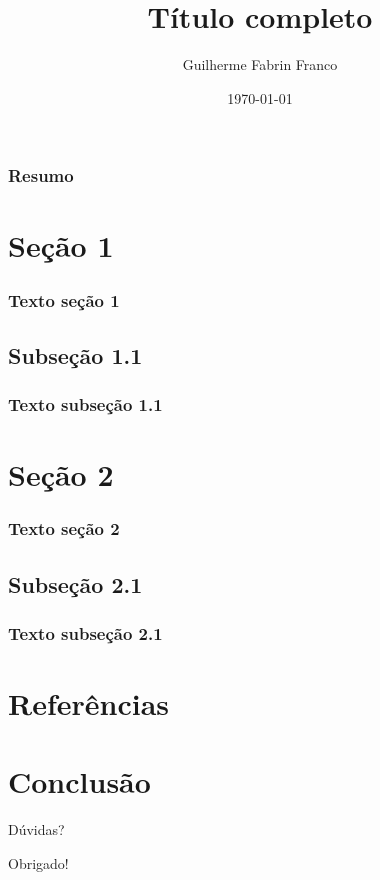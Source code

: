\documentclass{beamer}
\title[Título curto]{Título completo}
\author[Guilherme]{Guilherme Fabrin Franco}
\institute[PUCRS]
{
	Pontifícia Universidade Católica do Rio Grande do Sul \\
	\medskip
	\href{mailto:guilherme.fabrin@gmail.com}{guilherme.fabrin@gmail.com}
	\linebreak %
	\href{mailto:guilherme.franco93@edu.pucrs.br}{guilherme.franco93@edu.pucrs.br}
}
\date{\today}
\begin{document}
\begin{frame}
\titlepage
\end{frame}

\begin{frame}
\frametitle{Resumo}
\tableofcontents
\end{frame}

\section{Seção 1}
\begin{frame}
	\frametitle{Texto seção 1}
\end{frame}

\subsection{Subseção 1.1}
\begin{frame}
	\frametitle{Texto subseção 1.1}
\end{frame}

\section{Seção 2}
\begin{frame}
	\frametitle{Texto seção 2}
\end{frame}

\subsection{Subseção 2.1}
\begin{frame}
	\frametitle{Texto subseção 2.1}
\end{frame}

\section{Referências}
\begin{frame}[allowframebreaks]
	
	
\end{frame}

\section{Conclusão}
\begin{frame}
	\centerline{Dúvidas?}
	\centerline{Obrigado!}
\end{frame}
\end{document}
